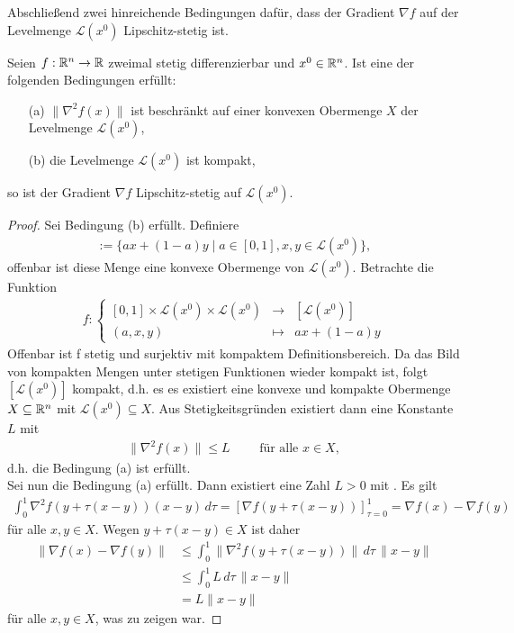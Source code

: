 Abschließend zwei hinreichende Bedingungen dafür, dass der Gradient $\nabla f$ auf der Levelmenge $\mathcal{L}(x^0)$ Lipschitz-stetig ist.
\begin{lemma}
	Seien $f: \mathbb{R}^n \to \mathbb{R}$ zweimal stetig differenzierbar und $x^0 \in \mathbb{R}^n$. Ist eine der folgenden Bedingungen erfüllt:
	\begin{enumerate}
	\item[(a)] $\| \nabla^2 f(x) \|$ ist beschränkt auf einer konvexen Obermenge $X$ der Levelmenge $\mathcal{L}(x^0)$,
	\item[(b)] die Levelmenge $\mathcal{L}(x^0)$ ist kompakt,
	\end{enumerate}
	so ist der Gradient $\nabla f$ Lipschitz-stetig auf $\mathcal{L}(x^0)$. 
\end{lemma}

\begin{proof}
	Sei Bedingung (b) erfüllt. Definiere 
	\begin{align*}
		[\mathcal{L}(x^0)]:= \{ ax+(1-a)y \mid a \in [0,1], x,y \in \mathcal{L}(x^0) \},
	\end{align*} offenbar ist diese Menge eine konvexe Obermenge von $\mathcal{L}(x^0)$. Betrachte die Funktion  
	\begin{align*}
	f \colon \left\lbrace%
	\begin{array}{ccl}%
		[0,1] \times \mathcal{L}(x^0) \times \mathcal{L}(x^0) & \to & [\mathcal{L}(x^0)] \\%
		(a,x,y) & \mapsto & ax+(1-a)y%
	\end{array}%
\right.
	\end{align*}
	Offenbar ist f stetig und surjektiv mit kompaktem Definitionsbereich. Da das Bild von kompakten Mengen unter stetigen Funktionen wieder kompakt ist, folgt $[\mathcal{L}(x^0)]$ kompakt, d.h. es es existiert eine konvexe und kompakte Obermenge $X \subseteq \mathbb{R}^n$ mit $\mathcal{L}(x^0) \subseteq X$.
	Aus Stetigkeitsgründen existiert dann eine Konstante $L$ mit 
	\begin{align}
		\| \nabla^2 f(x)\| \leq L \qquad \text{ für alle } x \in X, \label{wa}
	\end{align}
	d.h. die Bedingung (a) ist erfüllt. \\
	Sei nun die Bedingung (a) erfüllt. Dann existiert eine Zahl $L>0$ mit  . Es gilt
	\begin{align*}
		 \int_{0}^{1} \nabla^2 f(y+ \tau(x-y))(x-y) \, d \tau = \left[\nabla f(y+ \tau(x-y))\right]_{\tau =0}^1 = \nabla f(x) - \nabla f(y)
	\end{align*}
	für alle $x,y\in X$. Wegen $y+\tau (x-y) \in X$ ist daher
	\begin{align*}
		\| \nabla f(x) - \nabla f(y) \| &\leq \int_{0}^{1} \| \nabla^2 f(y+ \tau(x-y)) \|  \, d \tau \, \|x-y\| \\
		&\leq \int_0^1 L \, d\tau \, \| x-y \| \\
		&= L \| x-y \|
	\end{align*}
	für alle $x,y \in X$, was zu zeigen war. 
\end{proof}

\undef\nat
\undef\integer
\undef\ratio
\undef\real
\undef\complex
\undef\korper